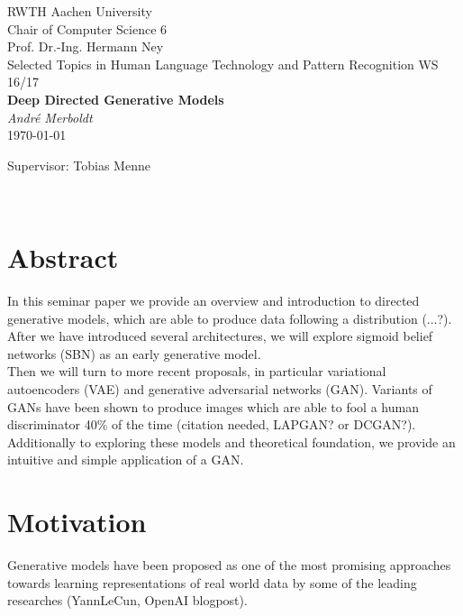 \documentclass[twoside,11pt,a4paper]{article}
\theoremstyle{break}
\begin{document}
\pagestyle{empty}

\begin{center}

    RWTH Aachen University\\
    Chair of Computer Science 6 \\
    Prof. Dr.-Ing. Hermann Ney\\[6ex]
    Selected Topics in Human Language Technology and Pattern Recognition WS 16/17\\[12ex]

    \LARGE
    \textbf{Deep Directed Generative Models} \\[6ex]
    \textit{André Merboldt} \\[6ex]
    \today

    \vfill
    \Large Supervisor: Tobias Menne
\end{center}

\newpage
\
\newpage


\pagestyle{headings}
\tableofcontents
\listoftables
\listoffigures
\newpage
\pagestyle{headings}


\section{Abstract}
\label{sec:abstract}
In this seminar paper we provide an overview and introduction to directed generative models,
which are able to produce data following a distribution (...?).
After we have introduced several architectures, we will explore sigmoid belief networks (SBN)
as an early generative model.\\

Then we will turn to more recent proposals, in particular variational autoencoders (VAE) and
generative adversarial networks (GAN).
Variants of GANs have been shown to produce images which are able to fool a human discriminator 40\% of the time (citation needed, LAPGAN? or DCGAN?).
Additionally to exploring these models and theoretical foundation, we provide an intuitive and simple application of a GAN.






\section{Motivation}
\label{sec:motivation}
Generative models have been proposed as one of the most promising approaches towards
learning representations of real world data by some of the leading researches (YannLeCun, OpenAI blogpost).
\end{document}
